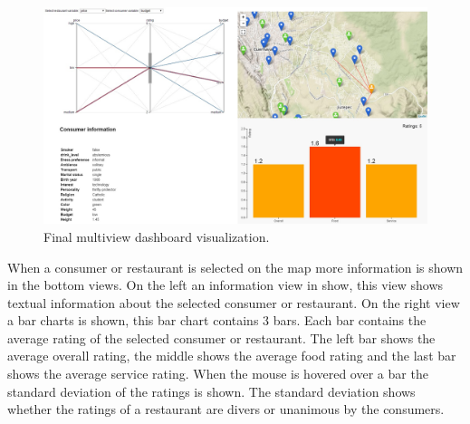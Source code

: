 \begin{figure}[h!]
 \centering
 \includegraphics[width=1\textwidth]{img/dashboard-final.jpg}
 \caption{Final multiview dashboard visualization.}
 \label{dashboard-view}
\end{figure}

When a consumer or restaurant is selected on the map more information is shown in the bottom views.
On the left an information view in show, this view shows textual information about the selected consumer or restaurant.
On the right view a bar charts is shown, this bar chart contains 3 bars.
Each bar contains the average rating of the selected consumer or restaurant.
The left bar shows the average overall rating, the middle shows the average food rating and the last bar shows the average service rating.
When the mouse is hovered over a bar the standard deviation of the ratings is shown.
The standard deviation shows whether the ratings of a restaurant are divers or unanimous by the consumers.



